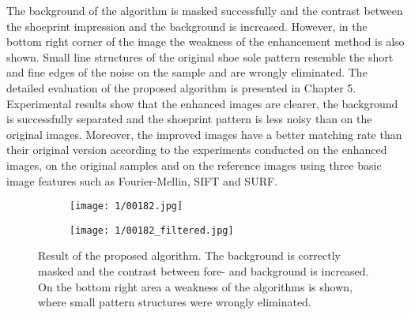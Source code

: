 \documentclass[draft,final]{vutinfth} %
\begin{document}
The background of the algorithm is masked successfully and the contrast between the shoeprint impression and the background is increased.
However, in the bottom right corner of the image the weakness of the enhancement method is also shown.
Small line structures of the original shoe sole pattern resemble the short and fine edges of the noise on the sample and are wrongly eliminated.
The detailed evaluation of the proposed algorithm is presented in Chapter 5.
Experimental results show that the enhanced images are clearer, the background is successfully separated and the shoeprint pattern is less noisy than on the original images.
Moreover, the improved images have a better matching rate than their original version according to the experiments conducted on the enhanced images, on the original samples and on the reference images using three basic image features such as Fourier-Mellin, SIFT and SURF.


\begin{figure}[H]
  \centering
  \begin{subfigure}[t]{0.45\columnwidth}
    \centering
    \texttt{[image: 1/00182.jpg]}
    \label{fig:intro:orig}
  \end{subfigure}
  \begin{subfigure}[t]{0.45\columnwidth}
    \centering
    \texttt{[image: 1/00182\_filtered.jpg]}
    \label{fig:intro:enhanced}
  \end{subfigure}
  \caption{Result of the proposed algorithm. The background is correctly masked and the contrast between fore- and background is increased. On the bottom right area a weakness of the algorithms is shown, where small pattern structures were wrongly eliminated.  }
  \label{fig:example}
\end{figure}
\end{document}
